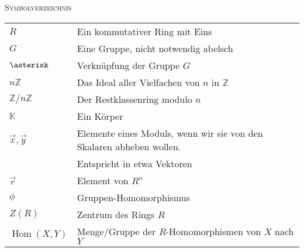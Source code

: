 \documentclass[a4paper]{amsart}
\theoremstyle{definition}
\DeclareMathOperator{\Hom}{Hom}
\newcommand{\Z}{\ensuremath{\mathbb{ Z }}}
\newcommand{\K}{\ensuremath{\mathbb{ K }}}
\newcommand{\zz}[1]{\ensuremath{\Z /#1\Z}}
\begin{document}
\begin{large}
    \centerline{\textsc{Symbolverzeichnis}}
\end{large}
\bigskip

\renewcommand*{\arraystretch}{1}

\begin{tabular}{ll}
    $R$                                 & Ein kommutativer Ring mit Eins\\
    $G$                                 & Eine Gruppe, nicht notwendig abelsch\\
    $\asterisk$                         & Verknüpfung der Gruppe $G$\\
    $n\Z$                               & Das Ideal aller Vielfachen von $n$ in $\Z$\\
    $\zz{n}$                            & Der Restklassenring modulo $n$\\
    $\K$                                & Ein Körper\\
    $\vec x, \vec y$                    & Elemente eines Moduls, wenn wir sie von den Skalaren abheben wollen. \\
                                        & Entspricht in etwa Vektoren\\
    $\vec r$                            & Element von $R^n$\\
    $\phi$                              & Gruppen-Homomorphismus\\
    $Z(R)$                              & Zentrum des Rings $R$\\
    $\Hom(X,Y)$                         & Menge/Gruppe der $R$-Homomorphismen von $X$ nach $Y$
    
\end{tabular}
\end{document}
